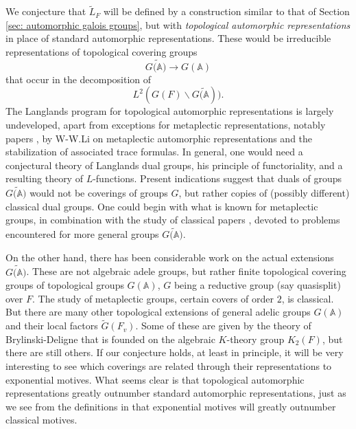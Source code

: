 \documentclass[preprint,12pt, leqno]{elsarticle}
\newcommand{\mA}{\mathbb{A}}
\newcommand{\ubf}[1]{\textit{#1}}
\numberwithin{equation}{section}
\theoremstyle{named}
\begin{document}
We conjecture that $\widetilde{L}_F$ will be defined by a construction similar to that of Section \ref{sec: automorphic galois groups}, but with \ubf{topological automorphic representations} in place of standard automorphic representations. These would be irreducible representations of topological covering groups
\begin{equation*}
    G\widetilde{(\mathbb{A}}) \longrightarrow G(\mathbb{A})
\end{equation*}
that occur in the decomposition of 
\begin{equation*}
    L^2(G(F) \backslash  G\widetilde{(\mathbb{A}})).
\end{equation*}
The Langlands program for topological automorphic representations is largely undeveloped, apart from exceptions for metaplectic representations, notably papers \cite{WL2}, \cite{WL1} by W-W.Li on metaplectic automorphic representations and the stabilization of associated trace formulas. In general, one would need a conjectural theory of Langlands dual groups, his principle of functoriality, and a resulting theory of $L$-functions. Present indications suggest that duals of groups $ G\widetilde{(\mathbb{A}})$ would not be coverings of groups $\widehat{G}$, but rather copies of (possibly different) classical dual groups. One could begin with what is known for metaplectic groups, in combination with the study of classical papers \cite{GGW}, \cite{MW} devoted to problems encountered for more general groups $ G\widetilde{(\mathbb{A}})$.

On the other hand, there has been considerable work on the actual extensions $ G\widetilde{(\mathbb{A}})$. These are not algebraic adele groups, but rather finite topological covering groups of topological groups $G(\mA)$, $G$ being a reductive group (say quasisplit) over $F$. The study of metaplectic groups, certain covers of order $2$, is classical. But there are many other topological extensions of general adelic groups $G(\mA)$ and their local factors $\widetilde{G}(F_v)$. Some of these are given by the theory of Brylinski-Deligne \cite{BD} that is founded on the algebraic $K$-theory group $K_2(F)$, but there are still others. If our conjecture holds, at least in principle, it will be very interesting to see which coverings are related through their representations to exponential motives. What seems clear is that topological automorphic representations greatly outnumber standard automorphic representations, just as we see from the definitions in \cite[Section 1.1.1]{FJ} that exponential motives will greatly outnumber classical motives.
\end{document}
